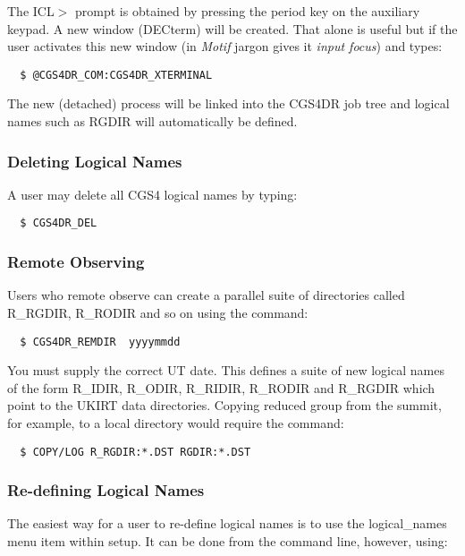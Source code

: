 {The {\sf ICL$>$} prompt is obtained by  pressing the period key on the
auxiliary keypad. A new window (DECterm) will be created. That alone is 
useful but if the user activates this new window (in {\em Motif} jargon gives
it {\em input focus}) and types:

\begin{verbatim}
  $ @CGS4DR_COM:CGS4DR_XTERMINAL
\end{verbatim}

The new (detached) process will be linked into the CGS4DR job tree and
logical names such as {\sf RGDIR} will automatically be defined.

\subsubsection{Deleting Logical Names}

A user may delete all CGS4 logical names by typing:

\begin{verbatim}
  $ CGS4DR_DEL
\end{verbatim}

\subsubsection{Remote Observing}

Users who remote observe can create a parallel suite of directories
called {\sf R\_RGDIR}, {\sf R\_RODIR} and so on using the command:

\begin{verbatim}
  $ CGS4DR_REMDIR  yyyymmdd
\end{verbatim}

You must supply the correct UT date. This defines a suite of new logical
names of the form {\sf R\_IDIR}, {\sf R\_ODIR}, {\sf R\_RIDIR}, 
{\sf R\_RODIR} and {\sf R\_RGDIR} which point to the
UKIRT data directories. Copying reduced group from the summit, for
example, to a local directory would require the command:

\begin{verbatim}
  $ COPY/LOG R_RGDIR:*.DST RGDIR:*.DST
\end{verbatim}

\subsubsection{Re-defining Logical Names}
\label{redefining_logical_names}

The easiest way for a user to re-define logical names is to use the
{\sf logical\_names} menu item within {\sf setup}. It can be done
from the command line, however, using:

}
